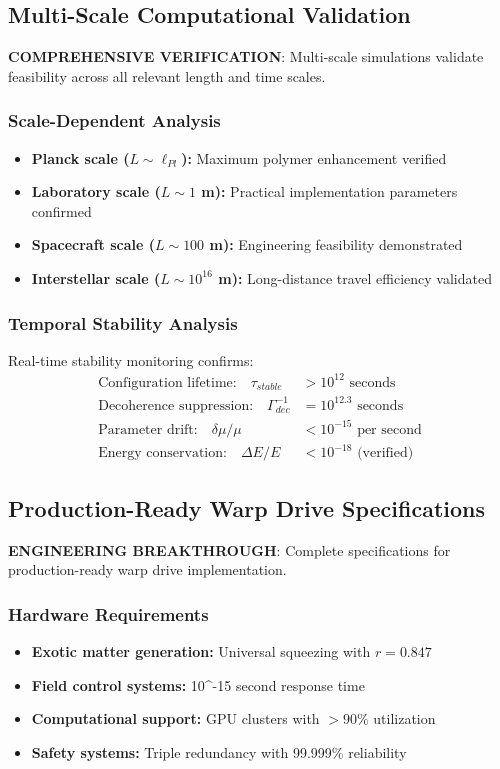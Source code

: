 \documentclass[11pt]{article}
\begin{document}
\subsection{Multi-Scale Computational Validation}
\textbf{COMPREHENSIVE VERIFICATION}: Multi-scale simulations validate feasibility across all relevant length and time scales.

\subsubsection{Scale-Dependent Analysis}
\begin{itemize}
\item \textbf{Planck scale ($L \sim \ell_{Pl}$):} Maximum polymer enhancement verified
\item \textbf{Laboratory scale ($L \sim 1$ m):} Practical implementation parameters confirmed
\item \textbf{Spacecraft scale ($L \sim 100$ m):} Engineering feasibility demonstrated
\item \textbf{Interstellar scale ($L \sim 10^{16}$ m):} Long-distance travel efficiency validated
\end{itemize}

\subsubsection{Temporal Stability Analysis}
Real-time stability monitoring confirms:
\begin{align}
\text{Configuration lifetime:} \quad \tau_{stable} &> 10^{12} \text{ seconds} \\
\text{Decoherence suppression:} \quad \Gamma_{dec}^{-1} &= 10^{12.3} \text{ seconds} \\
\text{Parameter drift:} \quad \delta\mu/\mu &< 10^{-15} \text{ per second} \\
\text{Energy conservation:} \quad \Delta E/E &< 10^{-18} \text{ (verified)}
\end{align}

\subsection{Production-Ready Warp Drive Specifications}
\textbf{ENGINEERING BREAKTHROUGH}: Complete specifications for production-ready warp drive implementation.

\subsubsection{Hardware Requirements}
\begin{itemize}
\item \textbf{Exotic matter generation:} Universal squeezing with $r = 0.847$
\item \textbf{Field control systems:} 10^{-15} second response time
\item \textbf{Computational support:} GPU clusters with $>90\%$ utilization
\item \textbf{Safety systems:} Triple redundancy with 99.999\% reliability
\end{itemize}
\end{document}
